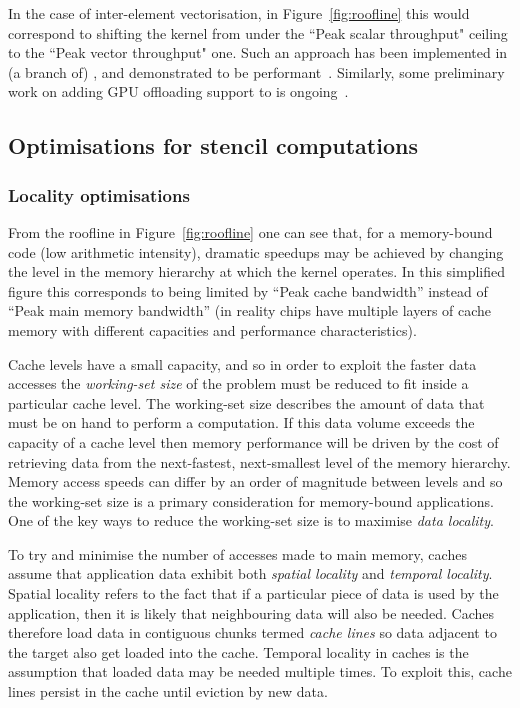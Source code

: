 In the case of inter-element vectorisation, in Figure~\ref{fig:roofline} this would correspond to shifting the kernel from under the ``Peak scalar throughput" ceiling to the ``Peak vector throughput" one.
Such an approach has been implemented in (a branch of) , and demonstrated to be performant~\cite{sunStudyVectorizationMatrixfree2020}.
Similarly, some preliminary work on adding GPU offloading support to  is ongoing~\cite{fenics2021-kulkarni}.

\subsection{Optimisations for stencil computations}
\label{sec:background_opt}

\subsubsection{Locality optimisations}
\label{sec:background_opt_locality}

From the roofline in Figure~\ref{fig:roofline} one can see that, for a memory-bound code (low arithmetic intensity), dramatic speedups may be achieved by changing the level in the memory hierarchy at which the kernel operates.
In this simplified figure this corresponds to being limited by ``Peak cache bandwidth'' instead of ``Peak main memory bandwidth'' (in reality chips have multiple layers of cache memory with different capacities and performance characteristics).

Cache levels have a small capacity, and so in order to exploit the faster data accesses the \textit{working-set size} of the problem must be reduced to fit inside a particular cache level.
The working-set size describes the amount of data that must be on hand to perform a computation.
If this data volume exceeds the capacity of a cache level then memory performance will be driven by the cost of retrieving data from the next-fastest, next-smallest level of the memory hierarchy.
Memory access speeds can differ by an order of magnitude between levels and so the working-set size is a primary consideration for memory-bound applications.
One of the key ways to reduce the working-set size is to maximise \textit{data locality}.

To try and minimise the number of accesses made to main memory, caches assume that application data exhibit both \textit{spatial locality} and \textit{temporal locality}.
Spatial locality refers to the fact that if a particular piece of data is used by the application, then it is likely that neighbouring data will also be needed.
Caches therefore load data in contiguous chunks termed \textit{cache lines} so data adjacent to the target also get loaded into the cache.
Temporal locality in caches is the assumption that loaded data may be needed multiple times.
To exploit this, cache lines persist in the cache until eviction by new data.

